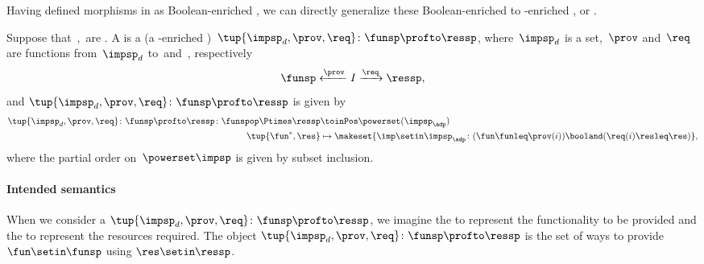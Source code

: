 Having defined morphisms in \DP as Boolean-enriched , we can directly generalize these Boolean-enriched  to \Set-enriched , or .
\begin{widepar}
    \begin{definition}
        \label{def:dpwithimp}
        Suppose that~\funsp,~\ressp are .
        A  is a  (a \Set-enriched )~$\tup{\impsp_d,\prov,\req}\colon \funsp\profto \ressp$, where~$\impsp_d$ is a set,~$\prov$ and~$\req$ are functions from~$\impsp_d$ to~\funsp and~\ressp, respectively
        \begin{equation}
            \funsp \xleftarrow{\prov} I \xrightarrow{\req} \ressp,
        \end{equation}
        and $\tup{\impsp_d,\prov,\req}\colon \funsp\profto \ressp$ is given by
        \begin{equation}
            \begin{aligned}
                \tup{\impsp_d,\prov,\req}\colon \funsp\profto \ressp \colon \funspop \Ptimes \ressp & \toinPos \powerset(\impsp_\adp) \\
                \tup{\fun^*, \res}                                                                  & \mapsto \makeset{ \imp \setin \impsp_\adp \colon ( \fun \funleq \prov(i)) \booland (\req(i) \resleq \res) },
            \end{aligned}
        \end{equation}
        where the partial order on~$\powerset\impsp$ is given by subset inclusion.
    \end{definition}
\end{widepar}

\paragraph{Intended semantics}
When we consider a  $\tup{\impsp_d, \prov, \req}\colon \funsp\profto \ressp$, we imagine the  \funsp to represent the functionality to be provided and the  \ressp to represent the resources required.
The object $\tup{\impsp_d,\prov,\req}\colon \funsp\profto \ressp$ is the set of ways to provide $\fun\setin \funsp$ using $\res\setin \ressp$.

